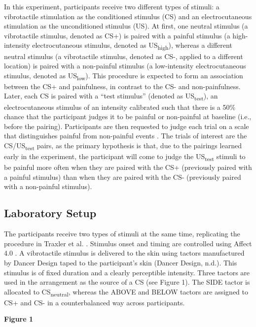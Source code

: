 \documentclass{article}
\begin{document}
In this experiment, participants receive two different types of stimuli: a vibrotactile stimulation as the conditioned stimulus (CS) and an electrocutaneous stimulation as the unconditioned stimulus (US). At first, one neutral stimulus (a vibrotactile stimulus, denoted as CS+) is paired with a painful stimulus (a high-intensity electrocutaneous stimulus, denoted as US\textsubscript{high}), whereas a different neutral stimulus (a vibrotactile stimulus, denoted as CS-, applied to a different location) is paired with a non-painful stimulus (a low-intensity electrocutaneous stimulus, denoted as US\textsubscript{low}). This procedure is expected to form an association between the CS+ and painfulness, in contrast to the CS- and non-painfulness. Later, each CS is paired with a “test stimulus” (denoted as US\textsubscript{test}), an electrocutaneous stimulus of an intensity calibrated such that there is a 50\% chance that the participant judges it to be painful or non-painful at baseline (i.e., before the pairing). Participants are then requested to judge each trial on a scale that distinguishes painful from non-painful events \textcite{Madden2019}. The trials of interest are the CS/US\textsubscript{test} pairs, as the primary hypothesis is that, due to the pairings learned early in the experiment, the participant will come to judge the US\textsubscript{test} stimuli to be painful more often when they are paired with the CS+ (previously paired with a painful stimulus) than when they are paired with the CS- (previously paired with a non-painful stimulus).

\subsection{Laboratory Setup}

The participants receive two types of stimuli at the same time, replicating the procedure in Traxler et al. \textcite{Traxler2019}. Stimulus onset and timing are controlled using Affect 4.0 \textcite{Spruyt2009}. A vibrotactile stimulus is delivered to the skin using tactors manufactured by Dancer Design taped to the participant's skin \textcite{Dancer Design0}(Dancer Design, n.d.). This stimulus is of fixed duration and a clearly perceptible intensity. Three tactors are used in the arrangement as the source of a CS (see Figure 1). The SIDE tactor is allocated to CS\textsubscript{neutral}, whereas the ABOVE and BELOW tactors are assigned to CS+ and CS- in a counterbalanced way across participants.

\textbf{Figure 1}
\end{document}
